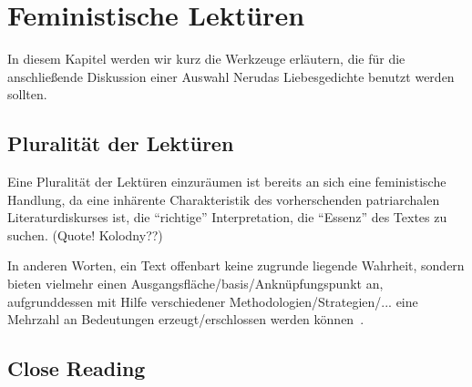\section{Feministische Lektüren}

In diesem Kapitel werden wir kurz die Werkzeuge erläutern, die für die anschließende Diskussion einer Auswahl Nerudas Liebesgedichte benutzt werden sollten.


\subsection{Pluralität der Lektüren}

Eine Pluralität der Lektüren einzuräumen ist bereits an sich eine feministische Handlung,
da eine inhärente Charakteristik des vorherschenden patriarchalen Literaturdiskurses ist, die ``richtige'' Interpretation, die ``Essenz'' des Textes zu suchen. (Quote! Kolodny??)
\begin{comment}
   * Pluralität (vlt in die Intro vorziehen)
     Annette Kolodny: "In my view, our purpose is not and should not be the formulation of any single reading method or potentially procrustean set of critical procedures[...] Instead, as I se it, our task is to initiate nothing less than a playful pluralism, responsice to the possibilities of multiple critical schools and methods, but captive of none.."
\end{comment}

In anderen Worten, ein Text offenbart keine zugrunde liegende Wahrheit, sondern bieten vielmehr einen Ausgangsfläche/basis/Anknüpfungspunkt an, aufgrunddessen mit Hilfe verschiedener Methodologien/Strategien/... eine Mehrzahl an Bedeutungen erzeugt/erschlossen werden können~\autocite{Beehler1988}.

\begin{comment}
[Beehler1988]
"Consequently, what we teach in the English class-
room is not "literature" but ways of reading. By
helping students to identify different methods,
different positions from which to view a work, we
help them to realize that texts do not "reveal"
truth: they simply provide the field upon which
meanings can be produced."
\end{comment}

\subsection{Close Reading}


